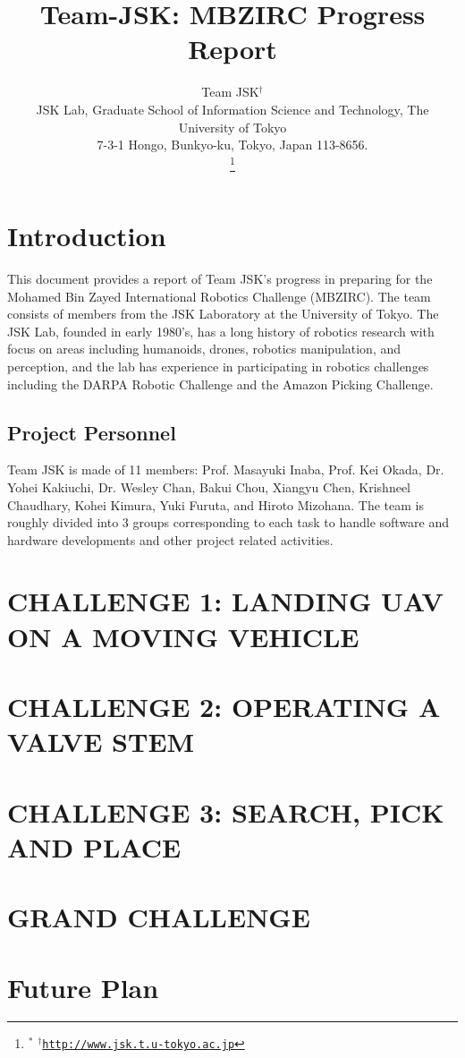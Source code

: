 \documentclass[letterpaper, 10 pt, conference]{ieeeconf}  %
\title{\LARGE \bf
  Team-JSK: MBZIRC Progress Report
}
\author{Team JSK$^\dagger$%
  \\ JSK Lab, Graduate School of Information Science and Technology, The University of Tokyo \\
  7-3-1 Hongo, Bunkyo-ku, Tokyo, Japan 113-8656.  \\
\thanks{$^{*}$ %
{$^\dagger$\tt\small \url{http://www.jsk.t.u-tokyo.ac.jp}}
}}
\begin{document}
\maketitle
\thispagestyle{empty}
\pagestyle{empty}


\section{Introduction}
This document provides a report of Team JSK's progress in preparing for the Mohamed Bin Zayed International Robotics Challenge (MBZIRC). The team consists of members from the JSK Laboratory at the University of Tokyo. The JSK Lab, founded in early 1980’s, has a long history of robotics research with focus on areas including humanoids, drones, robotics manipulation, and perception, and the lab has experience in participating in robotics challenges including the DARPA Robotic Challenge and the Amazon Picking Challenge.

\subsection{Project Personnel}
Team JSK is made of 11 members: Prof. Masayuki Inaba, Prof. Kei Okada, Dr. Yohei Kakiuchi, Dr. Wesley Chan, Bakui Chou, Xiangyu Chen, Krishneel Chaudhary, Kohei Kimura, Yuki Furuta, and Hiroto Mizohana. The team is roughly divided into 3 groups corresponding to each task to handle software and hardware developments and other project related activities.




\section{CHALLENGE 1: LANDING UAV ON A MOVING VEHICLE}




\section{CHALLENGE 2: OPERATING A VALVE STEM}


\section{CHALLENGE 3: SEARCH, PICK AND PLACE}




\section{GRAND CHALLENGE}


\section{Future Plan}
\end{document}
